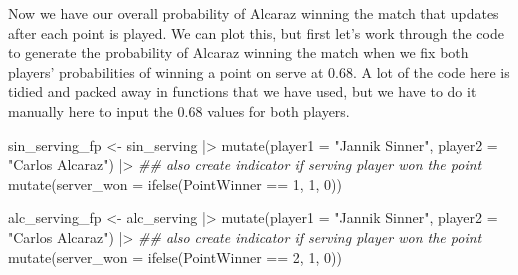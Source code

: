 \documentclass[
  letterpaper,
  DIV=11,
  numbers=noendperiod]{scrartcl}
\newenvironment{Shaded}{\begin{snugshade}}{\end{snugshade}}
\newcommand{\AttributeTok}[1]{\textcolor[rgb]{0.40,0.45,0.13}{#1}}
\newcommand{\DecValTok}[1]{\textcolor[rgb]{0.68,0.00,0.00}{#1}}
\newcommand{\DocumentationTok}[1]{\textcolor[rgb]{0.37,0.37,0.37}{\textit{#1}}}
\newcommand{\FunctionTok}[1]{\textcolor[rgb]{0.28,0.35,0.67}{#1}}
\newcommand{\NormalTok}[1]{\textcolor[rgb]{0.00,0.23,0.31}{#1}}
\newcommand{\OtherTok}[1]{\textcolor[rgb]{0.00,0.23,0.31}{#1}}
\newcommand{\SpecialCharTok}[1]{\textcolor[rgb]{0.37,0.37,0.37}{#1}}
\newcommand{\StringTok}[1]{\textcolor[rgb]{0.13,0.47,0.30}{#1}}
\begin{document}
\linespread{2}

Now we have our overall probability of Alcaraz winning the match that
updates after each point is played. We can plot this, but first let's
work through the code to generate the probability of Alcaraz winning the
match when we fix both players' probabilities of winning a point on
serve at 0.68. A lot of the code here is tidied and packed away in
functions that we have used, but we have to do it manually here to input
the 0.68 values for both players.

\linespread{0.9}

\begin{Shaded}
\begin{Highlighting}[]
\NormalTok{sin\_serving\_fp }\OtherTok{\textless{}{-}}\NormalTok{ sin\_serving }\SpecialCharTok{|\textgreater{}} 
  \FunctionTok{mutate}\NormalTok{(}\AttributeTok{player1 =} \StringTok{"Jannik Sinner"}\NormalTok{,}
         \AttributeTok{player2 =} \StringTok{"Carlos Alcaraz"}\NormalTok{) }\SpecialCharTok{|\textgreater{}}
    \DocumentationTok{\#\# also create indicator if serving player won the point}
    \FunctionTok{mutate}\NormalTok{(}\AttributeTok{server\_won =} \FunctionTok{ifelse}\NormalTok{(PointWinner }\SpecialCharTok{==} \DecValTok{1}\NormalTok{, }\DecValTok{1}\NormalTok{, }\DecValTok{0}\NormalTok{))}

\NormalTok{alc\_serving\_fp }\OtherTok{\textless{}{-}}\NormalTok{ alc\_serving }\SpecialCharTok{|\textgreater{}} 
  \FunctionTok{mutate}\NormalTok{(}\AttributeTok{player1 =} \StringTok{"Jannik Sinner"}\NormalTok{,}
         \AttributeTok{player2 =} \StringTok{"Carlos Alcaraz"}\NormalTok{) }\SpecialCharTok{|\textgreater{}}
    \DocumentationTok{\#\# also create indicator if serving player won the point}
    \FunctionTok{mutate}\NormalTok{(}\AttributeTok{server\_won =} \FunctionTok{ifelse}\NormalTok{(PointWinner }\SpecialCharTok{==} \DecValTok{2}\NormalTok{, }\DecValTok{1}\NormalTok{, }\DecValTok{0}\NormalTok{))}


\end{Highlighting}
\end{Shaded}
\end{document}
